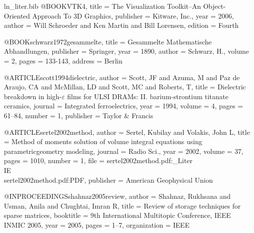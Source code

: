 \begin{filecontents*}{ln_liter.bib}
@BOOK{VTK4,
  title = {{The Visualization Toolkit}--An Object-Oriented Approach To {3D}
	Graphics},
  publisher = {Kitware, Inc.},
  year = {2006},
  author = {Will Schroeder and Ken Martin and Bill Lorensen},
  edition = {Fourth}
}

@BOOK{schwarz1972gesammelte,
  title = {Gesammelte Mathematische Abhandlungen},
  publisher = {Springer},
  year = {1890},
  author = {Schwarz, H.},
  volume = {2},
  pages = {133-143},
  address = {Berlin}
}

@ARTICLE{scott1994dielectric,
  author = {Scott, JF and Azuma, M and Paz de Araujo, CA and McMillan, LD and
	Scott, MC and Roberts, T},
  title = {Dielectric breakdown in high-$\varepsilon$ films for {ULSI DRAMs:
	II}. barium-strontium titanate ceramics},
  journal = {Integrated ferroelectrics},
  year = {1994},
  volume = {4},
  pages = {61--84},
  number = {1},
  publisher = {Taylor \& Francis}
}

@ARTICLE{sertel2002method,
  author = {Sertel, Kubilay and Volakis, John L},
  title = {Method of moments solution of volume integral equations using parametricgeometry
	modeling},
  journal = {Radio Sci.},
  year = {2002},
  volume = {37},
  pages = {1010},
  number = {1},
  file = {sertel2002method.pdf:_Liter\\IE\\sertel2002method.pdf:PDF},
  publisher = {American Geophysical Union}
}

@INPROCEEDINGS{shahnaz2005review,
  author = {Shahnaz, Rukhsana and Usman, Anila and Chughtai, Imran R},
  title = {Review of storage techniques for sparse matrices},
  booktitle = {9th International Multitopic Conference, IEEE INMIC 2005},
  year = {2005},
  pages = {1--7},
  organization = {IEEE}
}


\end{filecontents*}
